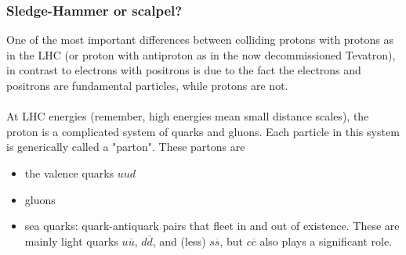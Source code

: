 \subsubsection{Sledge-Hammer or scalpel?}
One of the most important differences between colliding protons with protons as in the LHC (or proton with antiproton as in the now decommissioned Tevatron), in contrast to electrons with positrons is due to the fact the electrons and positrons are fundamental particles, while protons are not.
\\\\
At LHC energies (remember, high energies mean small distance scales), the proton is a complicated system of quarks and gluons. Each particle in this system is generically called a "parton". These partons are
\begin{itemize}
\item the valence quarks $uud$
\item gluons
\item sea quarks: quark-antiquark pairs that fleet in and out of existence. These are mainly light quarks $u\overline{u}$, $d\overline{d}$, and (less) $s\overline{s}$, but $c\overline{c}$ also plays a significant role.
\end{itemize}

